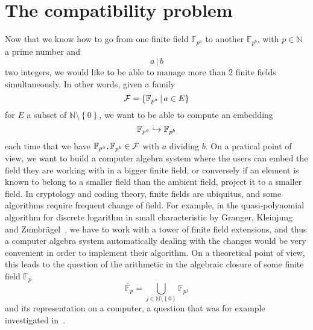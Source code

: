 \clearpage
\section{The compatibility problem}

Now that we know how to go from one finite field $\mathbb{F}_{p^a}$ to another
$\mathbb{F}_{p^b}$, with $p\in\mathbb{N}$ a prime number and
\[
  a\,|\,b
\]
two integers, we would like to be able to manage more than $2$ finite fields
simultaneously. In other words, given a family
\[
  \mathcal{F}=\left\{ \mathbb{F}_{p^{a}}\,|\,a\in E \right\}
\]
for $E$ a subset of $\mathbb{N}\setminus\left\{ 0 \right\}$,
we want to be able to compute an embedding
\[
  \mathbb{F}_{p^a}\hookrightarrow\mathbb{F}_{p^b}
\]
each time that we have $\mathbb{F}_{p^a}, \mathbb{F}_{p^b}\in\mathcal{F}$ with $a$
dividing $b$. On a pratical point of view, we want to build a computer algebra
system where the users can embed the field they are working with in a bigger
finite field, or conversely if an element is known to belong to a smaller field
than the ambient field, project it to a smaller field. In cryptology and coding
theory, finite fields are ubiquitus, and some algorithms require frequent change
of field. For example, in the
quasi-polynomial algorithm for discrete logarithm in small characteristic by
Granger, Kleinjung and Zumbrägel~\cite{GKZ14}, we have to work with a tower of
finite field extensions, and thus a computer algebra system automatically
dealing with the changes would be very convenient in order to implement their
algorithm. On a theoretical point of view, this leads to the question of the
arithmetic in the algebraic closure of some finite field $\mathbb{F}_p$
\[
  \bar{\mathbb{F}}_p=\bigcup_{j\in\mathbb{N}\setminus\left\{ 0
  \right\}}\mathbb{F}_{p^j}
\]
and its representation on a computer, a question that was for example
investigated in~\cite{DDS14}. 

